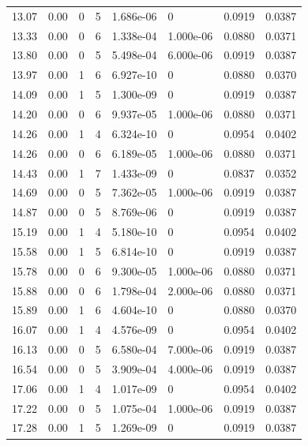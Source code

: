 \documentclass[preview]{standalone}
\begin{document}
{{{\begin{tabular}{L{1.2cm}C{1.2cm} C{0.3cm}C{0.5cm} C{1.4cm}C{1.4cm} C{1.4cm}C{1.4cm}}
  13.07  &  0.00  & 0     &  5 &  1.686e-06  & 0  & 0.0919 &  0.0387   \\ 
  13.33  &  0.00  & 0     &  6 &  1.338e-04  & 1.000e-06  & 0.0880 &  0.0371   \\ 
  13.80  &  0.00  & 0     &  5 &  5.498e-04  & 6.000e-06  & 0.0919 &  0.0387   \\ 
  13.97  &  0.00  & 1     &  6 &  6.927e-10  & 0  & 0.0880 &  0.0370   \\ 
  14.09  &  0.00  & 1     &  5 &  1.300e-09  & 0  & 0.0919 &  0.0387   \\ 
  14.20  &  0.00  & 0     &  6 &  9.937e-05  & 1.000e-06  & 0.0880 &  0.0371   \\ 
  14.26  &  0.00  & 1     &  4 &  6.324e-10  & 0  & 0.0954 &  0.0402   \\ 
  14.26  &  0.00  & 0     &  6 &  6.189e-05  & 1.000e-06  & 0.0880 &  0.0371   \\ 
  14.43  &  0.00  & 1     &  7 &  1.433e-09  & 0  & 0.0837 &  0.0352   \\ 
  14.69  &  0.00  & 0     &  5 &  7.362e-05  & 1.000e-06  & 0.0919 &  0.0387   \\ 
  14.87  &  0.00  & 0     &  5 &  8.769e-06  & 0  & 0.0919 &  0.0387   \\ 
  15.19  &  0.00  & 1     &  4 &  5.180e-10  & 0  & 0.0954 &  0.0402   \\ 
  15.58  &  0.00  & 1     &  5 &  6.814e-10  & 0  & 0.0919 &  0.0387   \\ 
  15.78  &  0.00  & 0     &  6 &  9.300e-05  & 1.000e-06  & 0.0880 &  0.0371   \\ 
  15.88  &  0.00  & 0     &  6 &  1.798e-04  & 2.000e-06  & 0.0880 &  0.0371   \\ 
  15.89  &  0.00  & 1     &  6 &  4.604e-10  & 0  & 0.0880 &  0.0370   \\ 
  16.07  &  0.00  & 1     &  4 &  4.576e-09  & 0  & 0.0954 &  0.0402   \\ 
  16.13  &  0.00  & 0     &  5 &  6.580e-04  & 7.000e-06  & 0.0919 &  0.0387   \\ 
  16.54  &  0.00  & 0     &  5 &  3.909e-04  & 4.000e-06  & 0.0919 &  0.0387   \\ 
  17.06  &  0.00  & 1     &  4 &  1.017e-09  & 0  & 0.0954 &  0.0402   \\ 
  17.22  &  0.00  & 0     &  5 &  1.075e-04  & 1.000e-06  & 0.0919 &  0.0387   \\ 
  17.28  &  0.00  & 1     &  5 &  1.269e-09  & 0  & 0.0919 &  0.0387   \\ 

\end{tabular}}}}
\end{document}
